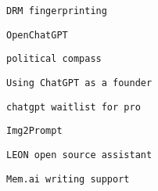            
           
            \protect\hypertarget{ID_839229689}{}{}

\begin{verbatim}
DRM fingerprinting
\end{verbatim}
           

           
           
            \protect\hypertarget{ID_1284347573}{}{}

\begin{verbatim}
OpenChatGPT
\end{verbatim}
           

           
           
            \protect\hypertarget{ID_1259185975}{}{}

\begin{verbatim}
political compass
\end{verbatim}
           

           
           
            \protect\hypertarget{ID_1837672178}{}{}

\begin{verbatim}
Using ChatGPT as a founder
\end{verbatim}
           

           
           
            \protect\hypertarget{ID_540708206}{}{}

\begin{verbatim}
chatgpt waitlist for pro
\end{verbatim}
           
         

         
         
          \protect\hypertarget{ID_272124356}{}{}

\begin{verbatim}
Img2Prompt
\end{verbatim}
         

         
         
          \protect\hypertarget{ID_1878430092}{}{}

\begin{verbatim}
LEON open source assistant
\end{verbatim}
         

         
         
          \protect\hypertarget{ID_806384401}{}{}

\begin{verbatim}
Mem.ai writing support
\end{verbatim}
         

